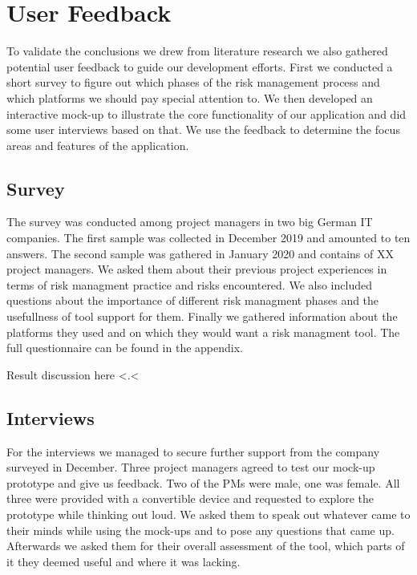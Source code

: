 
\section{User Feedback}
\label{sec:DomainA}
To validate the conclusions we drew from literature research we also gathered potential user feedback to guide our development efforts. First we conducted a short survey to figure out which phases of the risk management process and which platforms we should pay special attention to. We then developed an interactive mock-up to illustrate the core functionality of our application and did some user interviews based on that. We use the feedback to determine the focus areas and features of the application.
\subsection{Survey}
\label{sec:DomainAa}
The survey was conducted among project managers in two big German IT companies. The first sample was collected in December 2019 and amounted to ten answers. The second sample was gathered in January 2020 and contains of XX project managers. We asked them about their previous project experiences in terms of risk managment practice and risks encountered. We also included questions about the importance of different risk managment phases and the usefullness of tool support for them. Finally we gathered information about the platforms they used and on which they would want a risk managment tool. The full questionnaire can be found in the appendix.

Result discussion here <.<

\subsection{Interviews}
\label{sec:DomainAb}
For the interviews we managed to secure further support from the company surveyed in December. Three project managers agreed to test our mock-up prototype and give us feedback. Two of the PMs were male, one was female. All three were provided with a convertible device and requested to explore the prototype while thinking out loud. We asked them to speak out whatever came to their minds while using the mock-ups and to pose any questions that came up. Afterwards we asked them for their overall assessment of the tool, which parts of it they deemed useful and where it was lacking.

